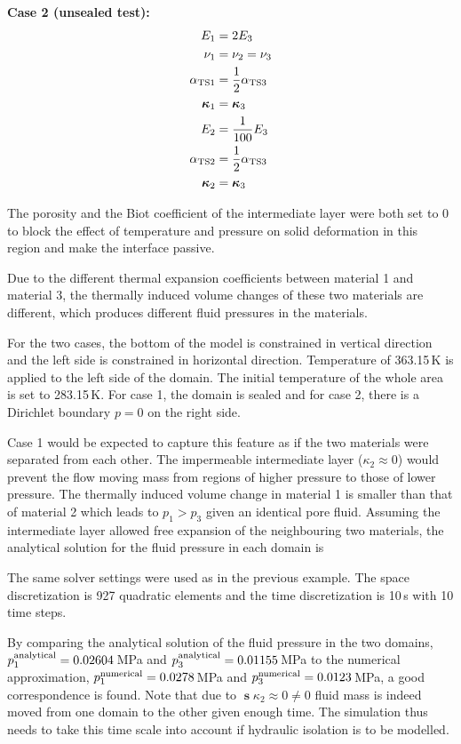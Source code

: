 \documentclass[a4paper,10pt]{article}
\begin{document}
\hfill
\begin{minipage}{0.4\textwidth}
\textbf{Case 2 (unsealed test):}
\begin{align*}
E_1 &= 2 E_3 \\
\nu_1 &= \nu_2 = \nu_3 \\
\alpha_\mathrm{TS1} &= \frac{1}{2} \alpha_\mathrm{TS3} \\
\boldsymbol{\kappa}_1 &= \boldsymbol{\kappa}_3 \\
E_2 &= \frac{1}{100} E_3 \\
\alpha_\mathrm{TS2} &= \frac{1}{2}\alpha_\mathrm{TS3} \\ 
\boldsymbol{\kappa}_2 &= \boldsymbol{\kappa}_3
\end{align*}
\end{minipage} \bigskip
The porosity and the Biot coefficient of the intermediate layer were both set to 0 to block the effect of temperature and pressure on solid deformation in this region and make the interface passive.

Due to the different thermal expansion coefficients between material 1 and material 3, the thermally induced volume changes of these two materials are different, which produces different fluid pressures in the materials.

For the two cases, the bottom of the model is constrained in vertical direction and the left side is constrained in horizontal direction. Temperature of 363.15\,K is applied to the left side of the domain. The initial temperature of the whole area is set to 283.15\,K. For case 1, the domain is sealed and for case 2, there is a Dirichlet boundary $p = 0$ on the right side. 

Case 1 would be expected to capture this feature as if the two materials were separated from each other. 
The impermeable intermediate layer ($\kappa_2 \approx 0$) would prevent the flow moving mass from regions of higher pressure to those of lower pressure. The thermally induced volume change in material 1 is smaller than that of material 2 which leads to $p_1 > p_3$ given an identical pore fluid. Assuming the intermediate layer allowed free expansion of the neighbouring two materials, the analytical solution for the fluid pressure in each domain is 

The same solver settings were used as in the previous example. The space discretization is 927 quadratic elements and the time discretization is 10\,s with 10 time steps.

By comparing the analytical solution of the fluid pressure in the two domains, $p_1^\mathrm{analytical} = 0.02604$\,MPa and $p_3^\mathrm{analytical} = 0.01155$\,MPa to the numerical approximation, $p_1^\mathrm{numerical} = 0.0278$\,MPa and $p_3^\mathrm{numerical} = 0.0123$\,MPa, a good correspondence is found. Note that due to $\mbfs{\kappa}_2 \approx 0 \neq 0$ fluid mass is indeed moved from one domain to the other given enough time. The simulation thus needs to take this time scale into account if hydraulic isolation is to be modelled.
\end{document}
